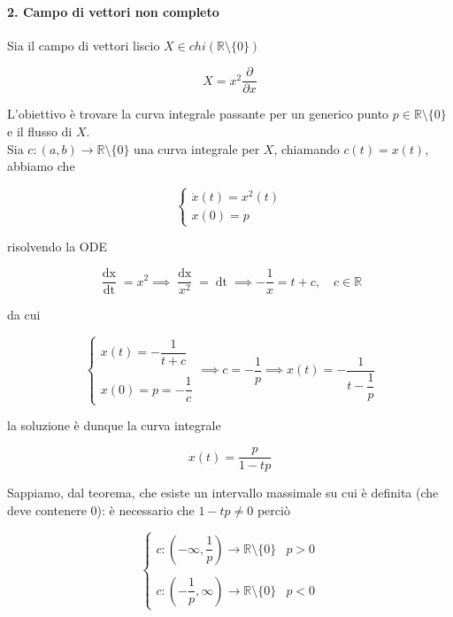 \paragraph{2. Campo di vettori non completo}

Sia il campo di vettori liscio $ X \in chi(\mathbb{R} \setminus \{0\}) $

\begin{equation}
	X = x^{2} \dfrac{\partial}{\partial x}
\end{equation}

L'obiettivo è trovare la curva integrale passante per un generico punto $ p \in \mathbb{R} \setminus \{0\} $ e il flusso di $ X $.\\
Sia $ c : (a,b) \to \mathbb{R} \setminus \{0\} $ una curva integrale per $ X $, chiamando $ c(t) = x(t) $, abbiamo che

\begin{equation}
	\begin{cases}
		\dot{x}(t) = x^{2}(t)\\
		x(0) = p
	\end{cases}
\end{equation}

risolvendo la ODE

\begin{equation}
	\dfrac{\operatorname{dx}}{\operatorname{dt}} = x^{2} %
	\implies %
	\dfrac{\operatorname{dx}}{x^{2}} = \operatorname{dt} %
	\implies %
	- \dfrac{1}{x} = t + c, \quad c \in \mathbb{R}
\end{equation}

da cui

\begin{equation}
	\begin{cases}
		x(t) = - \dfrac{1}{t + c}\\\\
		x(0) = p = - \dfrac{1}{c}
	\end{cases}%
	\implies %
	c = - \dfrac{1}{p} %
	\implies %
	x(t) = - \dfrac{1}{t - \dfrac{1}{p}}
\end{equation}

la soluzione è dunque la curva integrale

\begin{equation}
	x(t) = \dfrac{p}{1 - t p}
\end{equation}

Sappiamo, dal teorema, che esiste un intervallo massimale su cui è definita (che deve contenere 0): è necessario che $ 1-tp \neq 0 $ perciò

\begin{equation}
	\begin{cases}
		c : \left( -\infty, \dfrac{1}{p} \right) \to \mathbb{R} \setminus \{0\} & p > 0\\\\
		c : \left( -\dfrac{1}{p}, \infty \right) \to \mathbb{R} \setminus \{0\} & p < 0
	\end{cases}
\end{equation}


